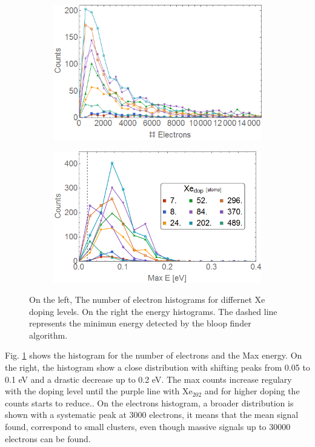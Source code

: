 \begin{figure}[h!]
\hfill
\begin{subfigure}[l]{0.48\textwidth}
\includegraphics[width=1\textwidth]{../Images/results/MIR_Ne_XeDop_39K/HElec.png} 
\end{subfigure} 
\begin{subfigure}[l]{0.48\textwidth}
\includegraphics[width=1\textwidth]{../Images/results/MIR_Ne_XeDop_39K/HEnergc.png} 
\end{subfigure} \hfill

\caption[MIR Ne-Xe doping scan.Histograms]{On the left, The number of electron histograms for differnet Xe doping levels. On the right the energy histograms. The dashed line represents the minimun energy detected by the bloop finder algorithm.}
\label{fig:NeonXedophisto}
\end{figure}


Fig. \ref{fig:NeonXedophisto} shows the histogram for the number of electrons  and the Max energy. On the right, the histogram show a close distribution with shifting peaks from 0.05 to 0.1 eV and a drastic decrease up to 0.2 eV. The max counts increase regulary with the doping level until the purple line with Xe$_{202}$ and for higher doping the counts starts to reduce.. On the electrons histogram, a broader distribution is shown with a systematic peak at 3000 electrons, it means that the mean signal found, correspond to small clusters, even though  massive signals up to 30000 electrons can be found. 


